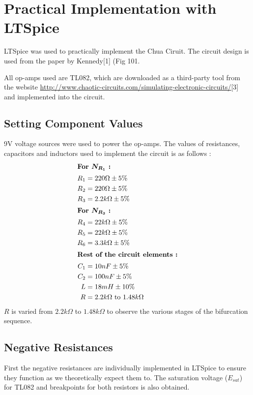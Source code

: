 \documentclass[12pt]{article}
\begin{document}
\section{Practical Implementation with LTSpice}
LTSpice was used to practically implement the Chua Ciruit. The circuit design is used from the paper by Kennedy[1] (Fig 101. \linebreak

All op-amps used are TL082, which are downloaded as a third-party tool from the website \url{http://www.chaotic-circuits.com/simulating-electronic-circuits/}[3] and implemented into the circuit.\linebreak
\subsection{Setting Component Values}
9V voltage sources were used to power the op-amps. The values of resistances, capacitors and inductors used to implement the circuit is as follows :
\begin{align*}
	\intertext{\textbf{For $\bm{N_{R_1}}$ :}}
	R_1 &= 220\Omega \pm 5\% \\
	R_2 &= 220\Omega \pm 5\% \\
	R_3 &= 2.2k\Omega \pm 5\% \\
	\intertext{\textbf{For $\bm{N_{R_2}}$ :}}
	R_4 &= 22k\Omega \pm 5\% \\
	R_5 &= 22k\Omega \pm 5\% \\
	R_6 &= 3.3k\Omega \pm 5\% \\ 
	\intertext{\textbf{Rest of the circuit elements :}}
	C_1 &= 10nF \pm 5\% \\
	C_2 &= 100nF \pm 5\% \\
	L &= 18mH \pm 10\% \\
	R &= 2.2k\Omega \text{ to } 1.48k\Omega 
\end{align*}
$R$ is varied from $2.2k\Omega$ to $1.48k\Omega$ to observe the various stages of the bifurcation sequence. 
\subsection{Negative Resistances}
First the negative resistances are individually implemented in LTSpice to ensure they function as we theoretically expect them to. The saturation voltage ($E_{sat}$) for TL082 and breakpoints for both resistors is also obtained. \linebreak
\end{document}
